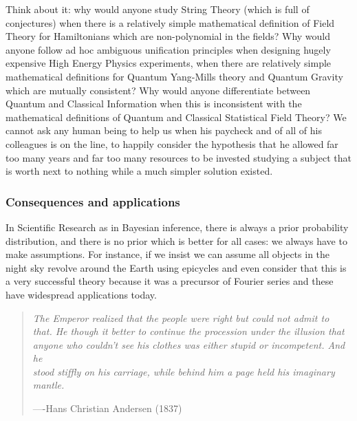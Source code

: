 \documentclass[11pt]{book}
\begin{document}
Think about it: why would anyone study String Theory (which is full of
conjectures) when there is a relatively simple mathematical definition
of Field Theory for Hamiltonians which are non-polynomial in the fields?
Why would anyone follow ad hoc ambiguous unification principles when
designing hugely expensive High Energy Physics experiments, when there
are relatively simple mathematical definitions for Quantum Yang-Mills
theory and Quantum Gravity which are mutually consistent? Why would
anyone differentiate between Quantum and Classical Information when this
is inconsistent with the mathematical definitions of Quantum and
Classical Statistical Field Theory? We cannot ask any human being to
help us when his paycheck and of all of his colleagues is on the line,
to happily consider the hypothesis that he allowed far too many years
and far too many resources to be invested studying a subject that is
worth next to nothing while a much simpler solution existed.

\hypertarget{consequences-and-applications}{%
\subsubsection{Consequences and
applications}\label{consequences-and-applications}}

In Scientific Research as in Bayesian inference, there is always a prior
probability distribution, and there is no prior which is better for all
cases\cite{dutchbook}: we
always have to make assumptions. For instance, if we insist we can
assume all objects in the night sky revolve around the Earth using
epicycles and even consider that this is a very successful theory
because it was a precursor of Fourier series and these have widespread
applications today\cite{acosta2019epicycles}.

\begin{quote}
\emph{The Emperor realized that the people were right but could not
admit to}\\
\emph{that. He though it better to continue the procession under the
illusion that}\\
\emph{anyone who couldn't see his clothes was either stupid or
incompetent. And he}\\
\emph{stood stiffly on his carriage, while behind him a page held his
imaginary}\\
\emph{mantle.}

----Hans Christian Andersen (1837)
\end{quote}
\end{document}
